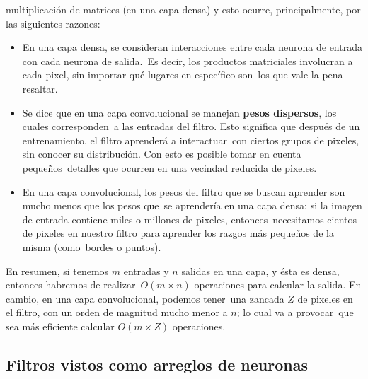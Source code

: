 multiplicación de matrices (en una capa densa) y esto ocurre, principalmente, por las siguientes razones:
\begin{itemize}
\item En una capa densa, se consideran interacciones entre cada neurona de entrada con cada neurona de salida.\
  Es decir, los productos matriciales involucran a cada pixel, sin importar qué lugares en específico son\
  los que vale la pena resaltar.
\item Se dice que en una capa convolucional se manejan \textbf{pesos dispersos}, los cuales corresponden\
  a las entradas del filtro. Esto significa que después de un entrenamiento, el filtro aprenderá a interactuar\
  con ciertos grupos de pixeles, sin conocer su distribución. Con esto es posible tomar en cuenta pequeños\
  detalles que ocurren en una vecindad reducida de pixeles.
\item En una capa convolucional, los pesos del filtro que se buscan aprender son mucho menos que los pesos que\
  se aprendería en una capa densa: si la imagen de entrada contiene miles o millones de pixeles, entonces\
  necesitamos cientos de pixeles en nuestro filtro para aprender los razgos más pequeños de la misma (como\
  bordes o puntos).
\end{itemize}\par
En resumen, si tenemos $m$ entradas y $n$ salidas en una capa, y ésta es densa, entonces habremos de realizar\
$O(m \times n)$ operaciones para calcular la salida. En cambio, en una capa convolucional, podemos tener\
una zancada $Z$ de pixeles en el filtro, con un orden de magnitud mucho menor a $n$; lo cual va a provocar\
que sea más eficiente calcular $O(m \times Z)$ operaciones.

\subsection{Filtros vistos como arreglos de neuronas}

